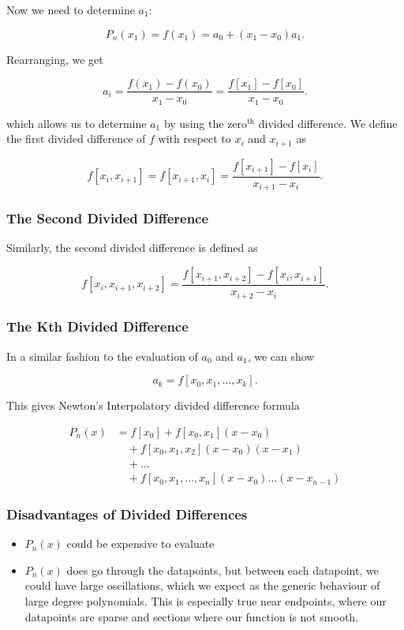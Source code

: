 \documentclass[12pt]{article}
\begin{document}
Now we need to determine $a_1$:

\[
P_n(x_1) = f(x_1) = a_0 + (x_1 - x_0) a_1
.\]

Rearranging, we get

\[
a_i = \frac{f(x_1) - f(x_0)}{x_1 - x_0} = \frac{f[x_1] - f[x_0]}{x_1 - x_0}
.\]

which allows us to determine $a_1$ by using the $\text{zero}^{\text{th}}$ 
divided difference. We define the first divided difference of $f$ with respect
to $x_i$ and $x_{i+1}$ as

\[
  f[x_i, x_{i+1}] = f[x_{i+1}, x_i] = \frac{f[x_{i+1}]-f[x_i]}{x_{i+1}-x_i}
.\]


\subsubsection{The Second Divided Difference}

Similarly, the second divided difference is defined as 

\[
  f[x_i, x_{i+1}, x_{i+2}] = \frac{f[x_{i+1}, x_{i+2}] - f[x_i, x_{i+1}]}{x_{i+2}-x_i}
.\]

\subsubsection{The Kth Divided Difference}

In a similar fashion to the evaluation of $a_0$ and $a_1$, we can show

\[
  a_k = f[x_0, x_1, \dots, x_k]
.\]

This gives Newton's Interpolatory divided difference formula

\begin{align*}  
  P_n(x) &= f[x_0] + f[x_0, x_1] (x-x_0) \\
         &\quad+ f[x_0, x_1, x_2] (x-x_0) (x-x_1) \\
         &\quad+ \dots \\
         &\quad+ f[x_0, x_1, \dots, x_n](x-x_0) \dots (x-x_{n-1})
\end{align*}

\subsubsection{Disadvantages of Divided Differences}

\begin{itemize}
\item $P_n(x)$ could be expensive to evaluate
\item $P_n(x)$ does go through the datapoints, but between each datapoint, we
  could have large oscillations, which we expect as the generic behaviour of
  large degree polynomials.
  \subitem This is especially true near endpoints, where our datapoints are
  sparse and sections where our function is not smooth.
\end{itemize}
\end{document}

